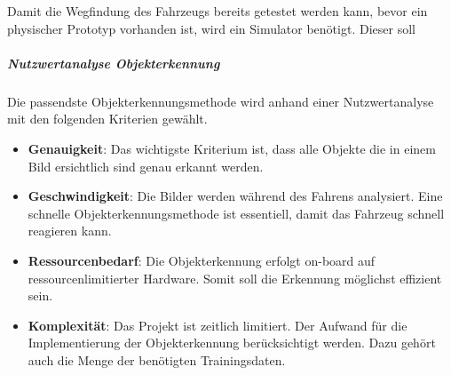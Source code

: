 Damit die Wegfindung des Fahrzeugs bereits getestet werden kann, bevor ein physischer Prototyp vorhanden ist, wird ein Simulator benötigt. Dieser soll 

\subparagraph{Nutzwertanalyse Objekterkennung}

Die passendste Objekterkennungsmethode wird anhand einer Nutzwertanalyse mit den folgenden Kriterien gewählt.

\begin{itemize}
\item \textbf{Genauigkeit}: Das wichtigste Kriterium ist, dass alle Objekte die in einem Bild ersichtlich sind genau erkannt werden.
\item \textbf{Geschwindigkeit}: Die Bilder werden während des Fahrens analysiert. Eine schnelle Objekterkennungsmethode ist essentiell, damit das Fahrzeug schnell reagieren kann.
\item \textbf{Ressourcenbedarf}: Die Objekterkennung erfolgt on-board auf ressourcenlimitierter Hardware. Somit soll die Erkennung möglichst effizient sein.
\item \textbf{Komplexität}: Das Projekt ist zeitlich limitiert. Der Aufwand für die Implementierung der Objekterkennung berücksichtigt werden. Dazu gehört auch die Menge der benötigten Trainingsdaten.
\end{itemize}

